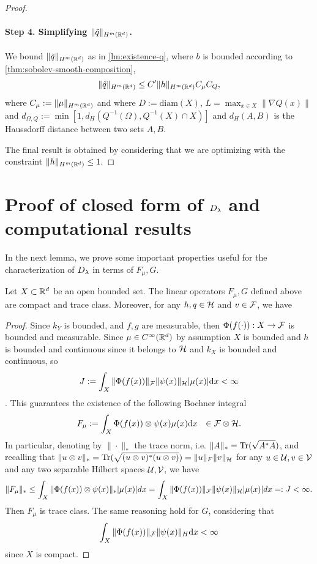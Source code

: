 \begin{proof}
\paragraph{Step 4. Simplifying $\|\tilde{q}\|_{H^m(\mathbb R^d)}$.}
We bound $\|\tilde{q}\|_{H^m(\mathbb R^d)}$ as in \cref{lm:existence-q}, where $b$ is bounded according to \cref{thm:sobolev-smooth-composition},
$$\|\tilde{q}\|_{H^m(\mathbb R^d)} \leq C^\prime\|h\|_{H^m(\mathbb R^d)} C_\mu C_Q,$$
where $C_\mu := \|\mu\|_{H^m(\mathbb R^d)}$ and
where $D := \textrm{diam}(X)$,  $L = \max_{x \in X} \|\nabla Q (x)\|$ and $d_{\Omega, Q} := \min[1, d_H(Q^{-1}(\Omega), Q^{-1}(X) \cap X)]$ and $d_H(A, B)$ is the Haussdorff distance between two sets $A, B$.

The final result is obtained by considering that we are optimizing with the constraint $\|h\|_{H^m(\mathbb R^d)} \leq 1$.
\end{proof}


\section{Proof of closed form of $D_\lambda$ and computational results}\label{sec:additional-proofs}

In the next lemma, we prove some important properties useful for the characterization of $D_\lambda$ in terms of $F_\mu, G$.


\begin{lemma}\label{lm:explicit-Fmu-G}
Let $X \subset \mathbb R^d$ be an open bounded set. The linear operators $F_\mu, G$ defined above are compact and trace class.
Moreover, for any $h, q \in \mathcal H$ and $v \in {\cal F}$, we have
\end{lemma}
\begin{proof}
Since $k_Y$ is bounded, and $f, g$ are measurable, then $\Phi(f(\cdot)):X \to {\cal F}$ is bounded and measurable. Since $\mu \in C^\infty(\mathbb R^d)$ by assumption $X$ is bounded and $h$ is bounded and continuous since it belongs to $\mathcal H$ and $k_X$ is bounded and continuous, so $$J := \int_X \|\Phi(f(x))\|_{\cal F} \|\psi(x)\|_{\mathcal H}|\mu(x)| \mathrm{d} x < \infty$$. This guarantees the existence of the following Bochner integral
$$F_\mu:=\int_X \Phi(f(x)) \otimes \psi(x) \mu(x)\mathrm{d} x ~~ \in {\cal F} \otimes {\mathcal H}.$$
In particular, denoting by $\|\cdot\|_*$ the trace norm, i.e. $\|A\|_* = \operatorname{Tr}(\sqrt{A^*A})$, and recalling that
$\|u \otimes v\|_* = \operatorname{Tr}(\sqrt{(u \otimes v)^*(u \otimes v)}) = \|u\|_{F}\|v\|_{\mathcal H}$ for any $u \in {\cal U}, v \in {\cal V}$ and any two separable Hilbert spaces ${\cal U}, {\cal V}$, we have
$$\|F_\mu\|_* \leq \int_X \|\Phi(f(x)) \otimes \psi(x)\|_* |\mu(x)| dx = \int_X \|\Phi(f(x))\|_{\cal F} \|\psi(x)\|_\mathcal H |\mu(x)| dx =: J < \infty.$$
Then $F_\mu$ is trace class.
The same reasoning hold for $G$, considering that $$\int_X \|\Phi(f(x))\|_{\cal F} \|\psi(x)\|_{H} \mathrm{d} x < \infty$$ since $X$ is compact.
\end{proof}

